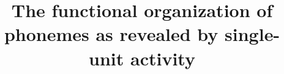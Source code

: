 \documentclass{article}
\title{The functional organization of phonemes as revealed by single-unit activity}
\author{}
\begin{document}
\maketitle



\begin{appendices}

\end{appendices}


\end{document}
